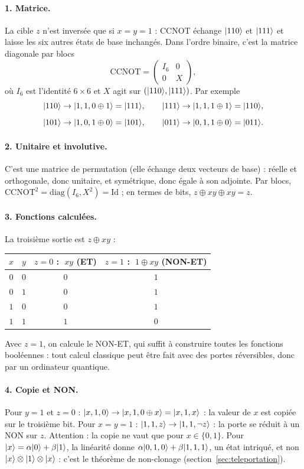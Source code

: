 \begin{correction}
\paragraph{1. Matrice.} La cible $z$ n'est inversée que si $x=y=1$ : CCNOT échange $|110\rangle$ et
$|111\rangle$ et laisse les six autres états de base inchangés. Dans l'ordre binaire, c'est la matrice
diagonale par blocs
\[
  \mathrm{CCNOT}=\begin{pmatrix}I_6&0\\0&X\end{pmatrix},
\]
où $I_6$ est l'identité $6\times6$ et $X$ agit sur $(|110\rangle,|111\rangle)$. Par exemple
\[
  |110\rangle\to|1,1,0\oplus1\rangle=|111\rangle,\qquad |111\rangle\to|1,1,1\oplus1\rangle=|110\rangle,
\]
\[
  |101\rangle\to|1,0,1\oplus0\rangle=|101\rangle,\qquad |011\rangle\to|0,1,1\oplus0\rangle=|011\rangle.
\]

\paragraph{2. Unitaire et involutive.} C'est une matrice de permutation (elle échange deux vecteurs de
base) : réelle et orthogonale, donc unitaire, et symétrique, donc égale à son adjointe. Par blocs,
$\mathrm{CCNOT}^2=\mathrm{diag}(I_6,X^2)=\mathrm{Id}$ ; en termes de bits, $z\oplus xy\oplus xy=z$.

\paragraph{3. Fonctions calculées.} La troisième sortie est $z\oplus xy$ :
\begin{center}
\renewcommand{\arraystretch}{1.25}
\begin{tabular}{@{}cc|cc@{}}
\toprule
$x$ & $y$ & $z=0$ : $\;xy$ (ET) & $z=1$ : $\;1\oplus xy$ (NON-ET) \\
\midrule
$0$ & $0$ & $0$ & $1$ \\
$0$ & $1$ & $0$ & $1$ \\
$1$ & $0$ & $0$ & $1$ \\
$1$ & $1$ & $1$ & $0$ \\
\bottomrule
\end{tabular}
\end{center}
Avec $z=1$, on calcule le NON-ET, qui suffit à construire toutes les fonctions booléennes : tout
calcul classique peut être fait avec des portes réversibles, donc par un ordinateur quantique.

\paragraph{4. Copie et NON.} Pour $y=1$ et $z=0$ : $|x,1,0\rangle\to|x,1,0\oplus x\rangle=|x,1,x\rangle$ : la
valeur de $x$ est copiée sur le troisième bit. Pour $x=y=1$ : $|1,1,z\rangle\to|1,1,\neg z\rangle$ : la porte
se réduit à un NON sur $z$. Attention : la copie ne vaut que pour $x\in\{0,1\}$. Pour
$|x\rangle=\alpha|0\rangle+\beta|1\rangle$, la linéarité donne $\alpha|0,1,0\rangle+\beta|1,1,1\rangle$, un état
intriqué, et non $|x\rangle\otimes|1\rangle\otimes|x\rangle$ : c'est le théorème de non-clonage
(section~\ref{sec:teleportation}).
\end{correction}

